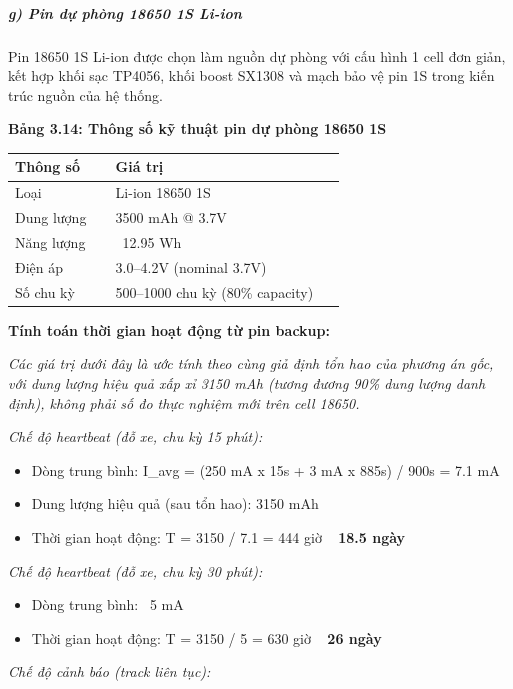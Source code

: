 \documentclass[13pt,a4paper]{extarticle}
\newcounter{none} %
\newcommand{\thesislongtableorignewline}{}
\let\thesislongtableorignewline\\
\renewcommand{\\}{\thesislongtableorignewline\hline}%
\let\\\thesislongtableorignewline
\newcommand{\thesistabletitle}[1]{%
  \begin{center}\textbf{#1}\end{center}%
}
\providecommand{\tightlist}{%
  \setlength{\itemsep}{0pt}\setlength{\parskip}{0pt}}
\begin{document}
\subparagraph{g) Pin dự phòng 18650 1S
Li-ion}\label{g-pin-dux1ef1-phuxf2ng-18650-1s-li-ion}

Pin 18650 1S Li-ion được chọn làm nguồn dự phòng với cấu hình 1 cell đơn
giản, kết hợp khối sạc TP4056, khối boost SX1308 và mạch bảo vệ pin 1S
trong kiến trúc nguồn của hệ thống.

\thesistabletitle{Bảng 3.14: Thông số kỹ thuật pin dự phòng 18650 1S}

{\def\LTcaptype{none} %
\begin{longtable}{|p{0.28\linewidth}|p{0.64\linewidth}|}
\hline \textbf{Thông số} & \textbf{Giá trị} \\
\hline
\endhead
\hline
\endlastfoot
Loại & Li-ion 18650 1S \\
Dung lượng & 3500 mAh @ 3.7V \\
Năng lượng & ~12.95 Wh \\
Điện áp & 3.0--4.2V (nominal 3.7V) \\
Số chu kỳ & 500--1000 chu kỳ (80\% capacity) \\
\end{longtable}
}

\textbf{Tính toán thời gian hoạt động từ pin backup:}

\emph{Các giá trị dưới đây là ước tính theo cùng giả định tổn hao của
phương án gốc, với dung lượng hiệu quả xấp xỉ 3150 mAh (tương đương 90\%
dung lượng danh định), không phải số đo thực nghiệm mới trên cell
18650.}

\emph{Chế độ heartbeat (đỗ xe, chu kỳ 15 phút):}

\begin{itemize}
\tightlist
\item
  Dòng trung bình: I\_avg = (250 mA x 15s + 3 mA x 885s) / 900s = 7.1 mA
\item
  Dung lượng hiệu quả (sau tổn hao): 3150 mAh
\item
  Thời gian hoạt động: T = 3150 / 7.1 = 444 giờ ~{}
  \textbf{18.5 ngày}
\end{itemize}

\emph{Chế độ heartbeat (đỗ xe, chu kỳ 30 phút):}

\begin{itemize}
\tightlist
\item
  Dòng trung bình: ~5 mA
\item
  Thời gian hoạt động: T = 3150 / 5 = 630 giờ ~{}
  \textbf{26 ngày}
\end{itemize}

\emph{Chế độ cảnh báo (track liên tục):}
\end{document}
